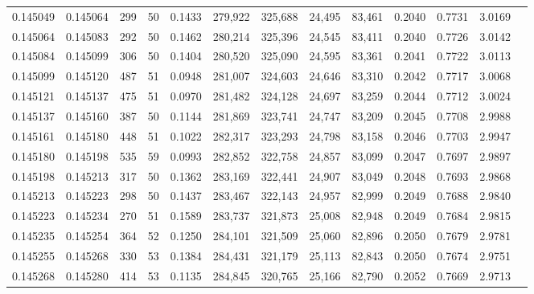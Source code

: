 \begin{tabular}{rrrrrrrrrrrrr}
0.145049 & 0.145064 &   299 &  50 &                                     0.1433 & 279,922 & 325,688 &  24,495 &  83,461 & 0.2040 & 0.7731 & 3.0169 \\
0.145064 & 0.145083 &   292 &  50 &                                     0.1462 & 280,214 & 325,396 &  24,545 &  83,411 & 0.2040 & 0.7726 & 3.0142 \\
0.145084 & 0.145099 &   306 &  50 &                                     0.1404 & 280,520 & 325,090 &  24,595 &  83,361 & 0.2041 & 0.7722 & 3.0113 \\
0.145099 & 0.145120 &   487 &  51 &                                     0.0948 & 281,007 & 324,603 &  24,646 &  83,310 & 0.2042 & 0.7717 & 3.0068 \\
0.145121 & 0.145137 &   475 &  51 &                                     0.0970 & 281,482 & 324,128 &  24,697 &  83,259 & 0.2044 & 0.7712 & 3.0024 \\
0.145137 & 0.145160 &   387 &  50 &                                     0.1144 & 281,869 & 323,741 &  24,747 &  83,209 & 0.2045 & 0.7708 & 2.9988 \\
0.145161 & 0.145180 &   448 &  51 &                                     0.1022 & 282,317 & 323,293 &  24,798 &  83,158 & 0.2046 & 0.7703 & 2.9947 \\
0.145180 & 0.145198 &   535 &  59 &                                     0.0993 & 282,852 & 322,758 &  24,857 &  83,099 & 0.2047 & 0.7697 & 2.9897 \\
0.145198 & 0.145213 &   317 &  50 &                                     0.1362 & 283,169 & 322,441 &  24,907 &  83,049 & 0.2048 & 0.7693 & 2.9868 \\
0.145213 & 0.145223 &   298 &  50 &                                     0.1437 & 283,467 & 322,143 &  24,957 &  82,999 & 0.2049 & 0.7688 & 2.9840 \\
0.145223 & 0.145234 &   270 &  51 &                                     0.1589 & 283,737 & 321,873 &  25,008 &  82,948 & 0.2049 & 0.7684 & 2.9815 \\
0.145235 & 0.145254 &   364 &  52 &                                     0.1250 & 284,101 & 321,509 &  25,060 &  82,896 & 0.2050 & 0.7679 & 2.9781 \\
0.145255 & 0.145268 &   330 &  53 &                                     0.1384 & 284,431 & 321,179 &  25,113 &  82,843 & 0.2050 & 0.7674 & 2.9751 \\
0.145268 & 0.145280 &   414 &  53 &                                     0.1135 & 284,845 & 320,765 &  25,166 &  82,790 & 0.2052 & 0.7669 & 2.9713 \\

\end{tabular}
